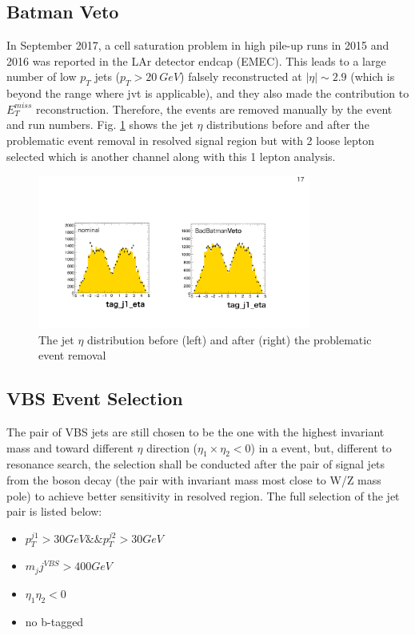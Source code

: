 \subsection{Batman Veto}
In September 2017, a cell saturation problem in high pile-up runs in 2015 and 2016 was reported in the LAr detector endcap (EMEC). This leads to a large number of low $p_{T}$ jets ($p_{T}>20~GeV$) falsely reconstructed at $|\eta|\sim 2.9$ (which is beyond the range where jvt is applicable), and they also made the contribution to $E^{miss}_{T}$ reconstruction. Therefore, the events are removed manually by the event and run numbers. Fig. \ref{Fig:batman_veto} shows the jet $\eta$ distributions before and after the problematic event removal in resolved signal region but with 2 loose lepton selected which is another channel along with this 1 lepton analysis. 
\begin{figure}[tbp]
	\begin{center}
		\includegraphics[width=0.8\textwidth,keepaspectratio]{Chapter5/SR_EtaTagResJet_BatmanVeto}
		\caption{The jet $\eta$ distribution before (left) and after (right) the problematic event removal}
		\label{Fig:batman_veto}
	\end{center}
\end{figure} 
 
\subsection{VBS Event Selection}
The pair of VBS jets are still chosen to be the one with the highest invariant mass and toward different $\eta$ direction ($\eta_1\times\eta_2<0$) in a event, but, different to resonance search, the selection shall be conducted after the pair of signal jets from the boson decay (the pair with invariant mass most close to W/Z mass pole) to achieve better sensitivity in resolved region. The full selection of the jet pair is listed below:
\begin{itemize}
	\item $p_{T}^{j1}>30GeV\&\&p_{T}^{j2}>30GeV$
	\item $m_jj^{VBS}>400GeV$
	\item $\eta_1\eta_2<0$
	\item no b-tagged
\end{itemize}
